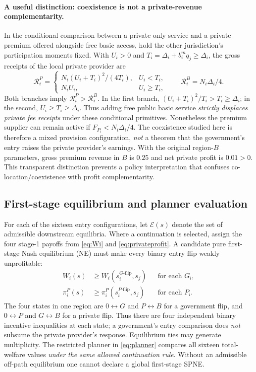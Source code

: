 \documentclass[11pt]{article}
\begin{document}
\paragraph{A useful distinction: coexistence is not a private-revenue complementarity.}
In the conditional comparison between a private-only service and a private premium offered alongside free basic access, hold the other jurisdiction's participation moments fixed. With $U_i>0$ and $T_i=\Delta_i+b_i^m q_j\geq\Delta_i$, the gross receipts of the local private provider are
\begin{equation}
 \mathcal R_i^P=
 \begin{cases}
  N_i(U_i+T_i)^2/(4T_i),& U_i<T_i,\\
  N_iU_i,&U_i\geq T_i,
 \end{cases}
 \qquad
 \mathcal R_i^B=N_i\Delta_i/4.
 \label{eq:revenue-crowding}
\end{equation}
Both branches imply $\mathcal R_i^P>\mathcal R_i^B$. In the first branch, $(U_i+T_i)^2/T_i>T_i\geq\Delta_i$; in the second, $U_i\geq T_i\geq\Delta_i$. Thus adding free public basic service \emph{strictly displaces private fee receipts} under these conditional primitives. Nonetheless the premium supplier can remain active if $F_{P_i}<N_i\Delta_i/4$. The coexistence studied here is therefore a mixed provision configuration, \emph{not} a theorem that the government's entry raises the private provider's earnings. With the original region-$B$ parameters, gross premium revenue in $B$ is $0.25$ and net private profit is $0.01>0$. This transparent distinction prevents a policy interpretation that confuses co-location/coexistence with profit complementarity.

\subsection{First-stage equilibrium and planner evaluation}
For each of the sixteen entry configurations, let $\mathcal E(s)$ denote the set of admissible downstream equilibria. Where a continuation is selected, assign the four stage-1 payoffs from \eqref{eq:Wi} and \eqref{eq:privateprofit}. A candidate pure first-stage Nash equilibrium (NE) must make every binary entry flip weakly unprofitable:
\begin{align}
 W_i(s)&\ge W_i(s_i^{G\text{-flip}},s_j)
       &&\text{for each }G_i,\label{eq:govBR}\\
 \pi_i^P(s)&\ge \pi_i^P(s_i^{P\text{-flip}},s_j)
       &&\text{for each }P_i.\label{eq:privBR}
\end{align}
The four states in one region are $0\leftrightarrow G$ and $P\leftrightarrow B$ for a government flip, and $0\leftrightarrow P$ and $G\leftrightarrow B$ for a private flip. Thus there are four independent binary incentive inequalities at each state; a government's entry comparison does \emph{not} subsume the private provider's response. Equilibrium ties may generate multiplicity. The restricted planner in \eqref{eq:planner} compares all sixteen total-welfare values \emph{under the same allowed continuation rule}. Without an admissible off-path equilibrium one cannot declare a global first-stage SPNE.
\end{document}
